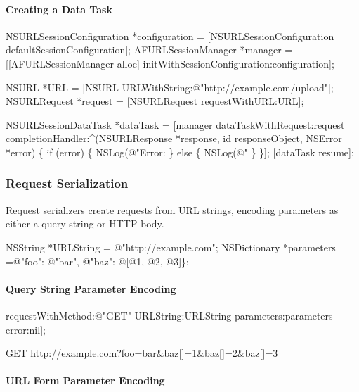 \paragraph*{Creating a Data Task}


\begin{DoxyCode}
NSURLSessionConfiguration *configuration = [NSURLSessionConfiguration defaultSessionConfiguration];
AFURLSessionManager *manager = [[AFURLSessionManager alloc] initWithSessionConfiguration:configuration];

NSURL *URL = [NSURL URLWithString:@"http://example.com/upload"];
NSURLRequest *request = [NSURLRequest requestWithURL:URL];

NSURLSessionDataTask *dataTask = [manager dataTaskWithRequest:request completionHandler:^(NSURLResponse
       *response, id responseObject, NSError *error) \{
    if (error) \{
        NSLog(@"Error: %
    \} else \{
        NSLog(@"%
    \}
\}];
[dataTask resume];
\end{DoxyCode}
 



\subsubsection*{Request Serialization}

Request serializers create requests from U\+RL strings, encoding parameters as either a query string or H\+T\+TP body.


\begin{DoxyCode}
NSString *URLString = @"http://example.com";
NSDictionary *parameters =@"foo": @"bar", @"baz": @[@1, @2, @3]\};
\end{DoxyCode}


\paragraph*{Query String Parameter Encoding}


\begin{DoxyCode}
[[AFHTTPRequestSerializer serializer] requestWithMethod:@"GET" URLString:URLString parameters:parameters
       error:nil];
\end{DoxyCode}
 \begin{DoxyVerb}GET http://example.com?foo=bar&baz[]=1&baz[]=2&baz[]=3
\end{DoxyVerb}


\paragraph*{U\+RL Form Parameter Encoding}


